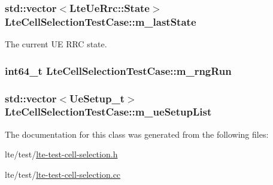\subsubsection[{\texorpdfstring{m\+\_\+last\+State}{m_lastState}}]{\setlength{\rightskip}{0pt plus 5cm}std\+::vector$<${\bf Lte\+Ue\+Rrc\+::\+State}$>$ Lte\+Cell\+Selection\+Test\+Case\+::m\+\_\+last\+State\hspace{0.3cm}{\ttfamily [private]}}\hypertarget{classLteCellSelectionTestCase_a1a501f3fc32e3ff1f46f0cbf326d2661}{}\label{classLteCellSelectionTestCase_a1a501f3fc32e3ff1f46f0cbf326d2661}


The current UE R\+RC state. 

\subsubsection[{\texorpdfstring{m\+\_\+rng\+Run}{m_rngRun}}]{\setlength{\rightskip}{0pt plus 5cm}int64\+\_\+t Lte\+Cell\+Selection\+Test\+Case\+::m\+\_\+rng\+Run\hspace{0.3cm}{\ttfamily [private]}}\hypertarget{classLteCellSelectionTestCase_a97ba27e3f212deb47d94c92b5e96f2f6}{}\label{classLteCellSelectionTestCase_a97ba27e3f212deb47d94c92b5e96f2f6}
\subsubsection[{\texorpdfstring{m\+\_\+ue\+Setup\+List}{m_ueSetupList}}]{\setlength{\rightskip}{0pt plus 5cm}std\+::vector$<${\bf Ue\+Setup\+\_\+t}$>$ Lte\+Cell\+Selection\+Test\+Case\+::m\+\_\+ue\+Setup\+List\hspace{0.3cm}{\ttfamily [private]}}\hypertarget{classLteCellSelectionTestCase_a09e2b5bfbe6cd4fbd482dde48078a8c7}{}\label{classLteCellSelectionTestCase_a09e2b5bfbe6cd4fbd482dde48078a8c7}


The documentation for this class was generated from the following files\+:\begin{DoxyCompactItemize}
\item 
lte/test/\hyperlink{lte-test-cell-selection_8h}{lte-\/test-\/cell-\/selection.\+h}\item 
lte/test/\hyperlink{lte-test-cell-selection_8cc}{lte-\/test-\/cell-\/selection.\+cc}\end{DoxyCompactItemize}
